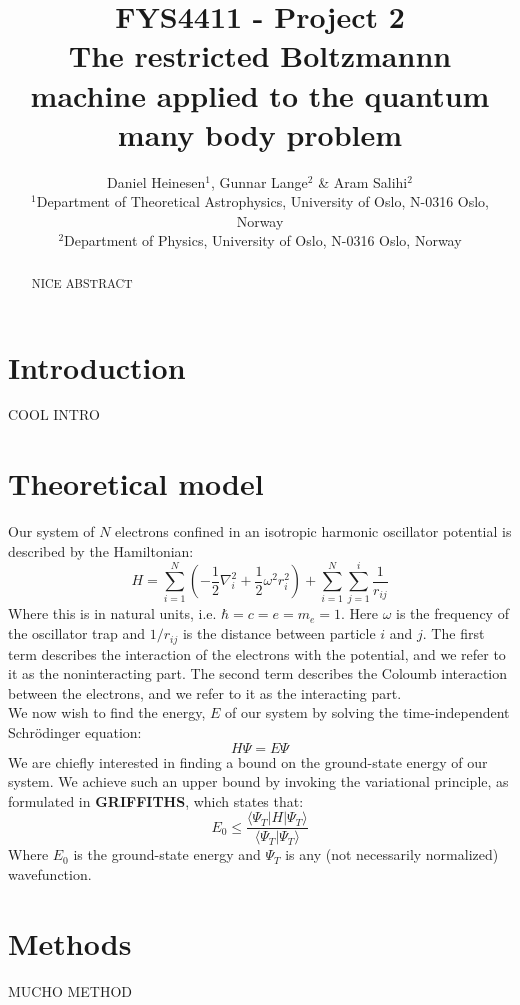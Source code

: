 \documentclass[a4paper, 10pt]{article}
\title{FYS4411 - Project 2\\
	The restricted Boltzmannn machine applied to the quantum many body problem}
\author{Daniel Heinesen$^1$, Gunnar Lange$^2$ \& Aram Salihi$^2$\\
	\small $^1$Department of Theoretical Astrophysics, University of Oslo, N-0316 Oslo, Norway\\
	\small $^2$Department of Physics, University of Oslo, N-0316 Oslo, Norway}
\begin{document}
	\maketitle
	\begin{abstract}
	\begin{center}
	 NICE ABSTRACT
\end{center}
	\end{abstract}
	\newpage
	\tableofcontents
	\newpage
	\section{Introduction}
	COOL INTRO
	\section{Theoretical model}
	Our system of $N$ electrons confined in an isotropic harmonic oscillator potential is described by the Hamiltonian:
	\begin{equation}
	H=\sum_{i=1}^N \left(-\frac{1}{2}\nabla_i^2 +\frac{1}{2}\omega^2 r_i^2\right)+\sum_{i=1}^N \sum_{j=1}^{i}\frac{1}{r_{ij}}
	\end{equation}
	Where this is in natural units, i.e. $\hbar=c=e=m_e=1$. Here $\omega$ is the frequency of the oscillator trap and $1/r_{ij}$ is the distance between particle $i$ and $j$. The first term describes the interaction of the electrons with the potential, and we refer to it as the noninteracting part. The second term describes the Coloumb interaction between the electrons, and we refer to it as the interacting part.\\
	\linebreak
	We now wish to find the energy, $E$ of our system by solving the time-independent Schrödinger equation:
	\begin{equation}
	H\Psi = E\Psi
	\end{equation}
	We are chiefly interested in finding a bound on the ground-state energy of our system. We achieve such an upper bound by invoking the variational principle, as formulated in \textbf{GRIFFITHS}, which states that:
	\begin{equation}
	E_0\leq \frac{\langle \Psi_T | H |\Psi_T \rangle}{\langle \Psi_T | \Psi_T \rangle}
	\end{equation} 
	Where $E_0$ is the ground-state energy and $\Psi_T$ is any (not necessarily normalized) wavefunction.  
	\section{Methods}\label{Method_section}
	MUCHO METHOD
\end{document}
